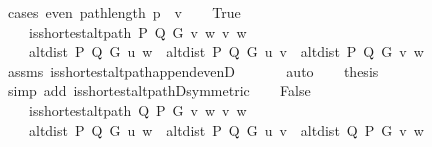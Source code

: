 \begin{isabellebody}
%
\isadelimproof
%
\endisadelimproof
%
\isatagproof
{}\isamarkupfalse%
\ {\isacharparenleft}{\kern0pt}cases\ {\isachardoublequoteopen}even\ {\isacharparenleft}{\kern0pt}path{\isacharunderscore}{\kern0pt}length\ {\isacharparenleft}{\kern0pt}p\ {\isacharat}{\kern0pt}\ {\isacharbrackleft}{\kern0pt}v{\isacharbrackright}{\kern0pt}{\isacharparenright}{\kern0pt}{\isacharparenright}{\kern0pt}{\isachardoublequoteclose}{\isacharparenright}{\kern0pt}\isanewline
\ \ \isamarkupfalse%
\ True\isanewline
\ \ \isamarkupfalse%
\isanewline
\ \ \ \ {\isachardoublequoteopen}is{\isacharunderscore}{\kern0pt}shortest{\isacharunderscore}{\kern0pt}alt{\isacharunderscore}{\kern0pt}path\ P\ Q\ G\ {\isacharbrackleft}{\kern0pt}v{\isacharcomma}{\kern0pt}\ w{\isacharbrackright}{\kern0pt}\ v\ w{\isachardoublequoteclose}\isanewline
\ \ \ \ {\isachardoublequoteopen}alt{\isacharunderscore}{\kern0pt}dist\ P\ Q\ G\ u\ w\ {\isacharequal}{\kern0pt}\ alt{\isacharunderscore}{\kern0pt}dist\ P\ Q\ G\ u\ v\ {\isacharplus}{\kern0pt}\ alt{\isacharunderscore}{\kern0pt}dist\ P\ Q\ G\ v\ w{\isachardoublequoteclose}\isanewline
\ \ \ \ \isamarkupfalse%
\ assms\ is{\isacharunderscore}{\kern0pt}shortest{\isacharunderscore}{\kern0pt}alt{\isacharunderscore}{\kern0pt}path{\isacharunderscore}{\kern0pt}append{\isacharunderscore}{\kern0pt}evenD{\isacharparenleft}{\kern0pt}{}{\isacharcomma}{\kern0pt}\ {}{\isacharparenright}{\kern0pt}\isanewline
\ \ \ \ \isamarkupfalse%
\ auto\isanewline
\ \ \isamarkupfalse%
\ {\isacharquery}{\kern0pt}thesis\isanewline
\ \ \ \ \isamarkupfalse%
\ {\isacharparenleft}{\kern0pt}simp\ add{\isacharcolon}{\kern0pt}\ is{\isacharunderscore}{\kern0pt}shortest{\isacharunderscore}{\kern0pt}alt{\isacharunderscore}{\kern0pt}pathD{\isacharparenleft}{\kern0pt}{}{\isacharparenright}{\kern0pt}{\isacharbrackleft}{\kern0pt}symmetric{\isacharbrackright}{\kern0pt}{\isacharparenright}{\kern0pt}\isanewline
{}\isamarkupfalse%
\isanewline
\ \ \isamarkupfalse%
\ False\isanewline
\ \ \isamarkupfalse%
\isanewline
\ \ \ \ {\isachardoublequoteopen}is{\isacharunderscore}{\kern0pt}shortest{\isacharunderscore}{\kern0pt}alt{\isacharunderscore}{\kern0pt}path\ Q\ P\ G\ {\isacharbrackleft}{\kern0pt}v{\isacharcomma}{\kern0pt}\ w{\isacharbrackright}{\kern0pt}\ v\ w{\isachardoublequoteclose}\isanewline
\ \ \ \ {\isachardoublequoteopen}alt{\isacharunderscore}{\kern0pt}dist\ P\ Q\ G\ u\ w\ {\isacharequal}{\kern0pt}\ alt{\isacharunderscore}{\kern0pt}dist\ P\ Q\ G\ u\ v\ {\isacharplus}{\kern0pt}\ alt{\isacharunderscore}{\kern0pt}dist\ Q\ P\ G\ v\ w{\isachardoublequoteclose}\isanewline

\end{isabellebody}
